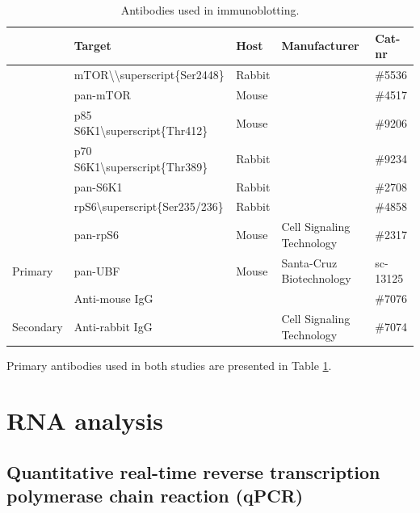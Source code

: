 \documentclass[twoside,10pt]{gihclass} %
\begin{document}
\begin{table}

\caption{\label{tab:primary-antibodies-table}Antibodies used in immunoblotting.}
\centering
\fontsize{7}{9}\selectfont
\begin{tabular}[t]{lllll}
\toprule
 & Target & Host & Manufacturer & Cat-nr\\
\midrule
 & mTOR\textbackslash{}\textbackslash{}superscript\{Ser2448\} & Rabbit &  & \#5536\\

 & pan-mTOR & Mouse &  & \#4517\\

 & p85 S6K1\textbackslash{}superscript\{Thr412\} & Mouse &  & \#9206\\

 & p70 S6K1\textbackslash{}superscript\{Thr389\} & Rabbit &  & \#9234\\

 & pan-S6K1 & Rabbit &  & \#2708\\

 & rpS6\textbackslash{}superscript\{Ser235/236\} & Rabbit &  & \#4858\\

 & pan-rpS6 & Mouse & \multirow{-7}{*}{\raggedright\arraybackslash Cell Signaling Technology} & \#2317\\

\multirow{-8}{*}{\raggedright\arraybackslash Primary} & pan-UBF & Mouse & Santa-Cruz Biotechnology & sc-13125\\
\cmidrule{1-5}
 & Anti-mouse IgG &  &  & \#7076\\

\multirow{-2}{*}{\raggedright\arraybackslash Secondary} & Anti-rabbit IgG &  & \multirow{-2}{*}{\raggedright\arraybackslash Cell Signaling Technology} & \#7074\\
\bottomrule
\end{tabular}
\end{table}
Primary antibodies used in both studies are presented in Table \ref{tab:primary-antibodies-table}.

\hypertarget{rna-analysis}{%
\section{RNA analysis}\label{rna-analysis}}

\hypertarget{quantitative-real-time-reverse-transcription-polymerase-chain-reaction-qpcr}{%
\subsection{Quantitative real-time reverse transcription polymerase chain reaction (qPCR)}\label{quantitative-real-time-reverse-transcription-polymerase-chain-reaction-qpcr}}
\end{document}

